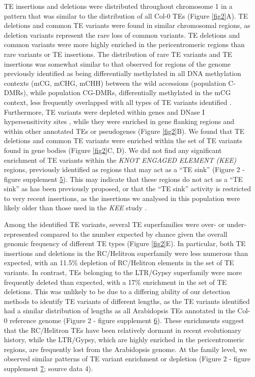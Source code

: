 \documentclass[12pt]{article}
\begin{document}
TE insertions and deletions were distributed throughout chromosome 1 in
a pattern that was similar to the distribution of all Col-0 TEs (Figure
\ref{fig2}A). TE deletions and common TE variants were found in similar
chromosomal regions, as deletion variants represent the rare loss of
common variants. TE deletions and common variants were more highly
enriched in the pericentromeric regions than rare variants or TE
insertions. The distribution of rare TE variants and TE insertions was
somewhat similar to that observed for regions of the genome previously
identified as being differentially methylated in all DNA methylation
contexts (mCG, mCHG, mCHH) between the wild accessions (population
C-DMRs), while population CG-DMRs, differentially methylated in the mCG
context, less frequently overlapped with all types of TE variants
identified \cite{Schmitz:2013iu}. Furthermore, TE variants were depleted
within genes and DNase I hypersensitivity sites \cite{Sullivan:2014ii},
while they were enriched in gene flanking regions and within other
annotated TEs or pseudogenes (Figure \ref{fig2}B). We found that TE deletions and
common TE variants were enriched within the set of TE variants found in
gene bodies (Figure \ref{fig2}C, D). We did not find any significant enrichment
of TE variants within the \emph{KNOT ENGAGED ELEMENT (KEE)} regions,
previously identified as regions that may act as a ``TE sink''
\cite{Grob:2014kg} (Figure 2 - figure supplement \hyperref[fig2s5]{5}). This may indicate
that these regions do not act as a ``TE sink'' as has been previously
proposed, or that the ``TE sink'' activity is restricted to very recent
insertions, as the insertions we analysed in this population were likely
older than those used in the \emph{KEE} study \cite{Grob:2014kg}.

Among the identified TE variants, several TE superfamilies were over-
or under-represented compared to the number expected by chance given
the overall genomic frequency of different TE types (Figure
\ref{fig2}E). In particular, both TE insertions and deletions in the
RC/Helitron superfamily were less numerous than expected, with an
11.5\% depletion of RC/Helitron elements in the set of TE variants. In
contrast, TEs belonging to the LTR/Gypsy superfamily were more
frequently deleted than expected, with a 17\% enrichment in the set of
TE deletions. This was unlikely to be due to a differing ability of
our detection methods to identify TE variants of different lengths, as
the TE variants identified had a similar distribution of lengths as
all Arabidopsis TEs annotated in the Col-0 reference genome (Figure 2
- figure supplement \hyperref[fig2s6]{6}). These enrichments suggest
that the RC/Helitron TEs have been relatively dormant in recent
evolutionary history, while the LTR/Gypsy, which are highly enriched
in the pericentromeric regions, are frequently lost from the
Arabidopsis genome. At the family level, we observed similar patterns
of TE variant enrichment or depletion (Figure 2 - figure supplement
\hyperref[fig2s7]{7}; source data 4).
\end{document}
